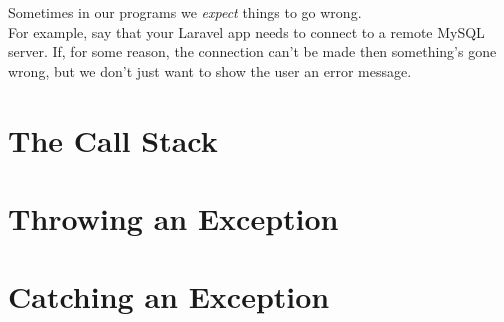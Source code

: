 Sometimes in our programs we \textit{expect} things to go wrong.
\\

For example, say that your Laravel app needs to connect to a remote MySQL server. If, for some reason, the connection can't be made then something's gone wrong, but we don't just want to show the user an error message.


\section{The Call Stack}

\section{Throwing an Exception}

\section{Catching an Exception}
